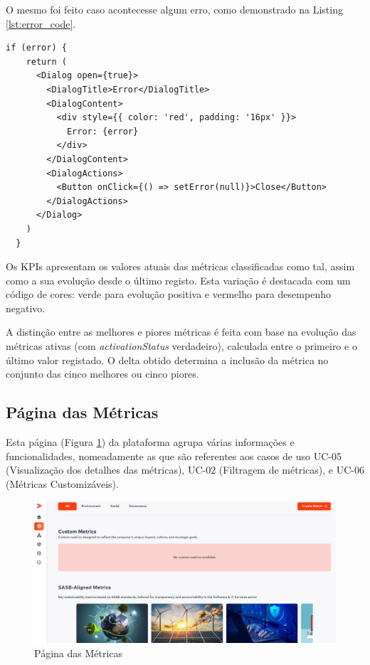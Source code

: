 O mesmo foi feito caso acontecesse algum erro, como demonstrado na Listing \ref{lst:error_code}.

\begin{lstlisting}[style=customts, caption={Componente mostrado no caso de erro no carregamento da página}, label={lst:error_code}]
  if (error) {
    return (
      <Dialog open={true}>
        <DialogTitle>Error</DialogTitle>
        <DialogContent>
          <div style={{ color: 'red', padding: '16px' }}>
            Error: {error}
          </div>
        </DialogContent>
        <DialogActions>
          <Button onClick={() => setError(null)}>Close</Button>
        </DialogActions>
      </Dialog>
    )
  }
\end{lstlisting}

Os KPIs apresentam os valores atuais das métricas classificadas como tal, assim como a sua evolução desde o último registo. Esta variação é destacada com um código de cores: verde para evolução positiva e vermelho para desempenho negativo.

A distinção entre as melhores e piores métricas é feita com base na evolução das métricas ativas (com \textit{activationStatus} verdadeiro), calculada entre o primeiro e o último valor registado. O delta obtido determina a inclusão da métrica no conjunto das cinco melhores ou cinco piores.

\subsection{Página das Métricas}

Esta página (Figura \ref{fig:metric_done}) da plataforma agrupa várias informações e funcionalidades, nomeadamente as que são referentes aos casos de uso UC-05 (Visualização dos detalhes das métricas), UC-02 (Filtragem de métricas), e UC-06 (Métricas Customizáveis).

\begin{figure}[H]
    \centering
    \includegraphics[width=\linewidth,keepaspectratio]{frontmatter/assets/platform_prints/metrics/metrics_done.png}
    \caption{Página das Métricas}
    \label{fig:metric_done}
\end{figure}

